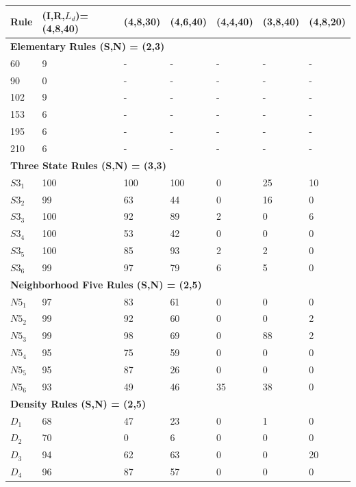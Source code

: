 \documentclass{elsarticle}
\begin{document}
\begin{multicols}{2}
\begin{table}[!htb] \centering
\small
\begin{tabular}{|l|l|l|l|l|l|l|}
\hline
\textbf{Rule} & \textbf{(I,R,$L_{d}$)=(4,8,40)} & \textbf{(4,8,30)} & 
\textbf{(4,6,40)} & \textbf{(4,4,40)} & \textbf{(3,8,40)} & \textbf{(4,8,20)} 
\\ \hline
\multicolumn{7}{|l|}{\textbf{Elementary Rules (S,N) = (2,3)}} \\ \hline
60 & 9 & - & - & - & - & - \\ \hline
90 & 0 & - & - & - & - & - \\ \hline
102 & 9 & - & - & - & - & - \\ \hline
153 & 6 & - & - & - & - & - \\ \hline
195 & 6 & - & - & - & - & - \\ \hline
210 & 6 & - & - & - & - & - \\ \hline
\multicolumn{7}{|l|}{\textbf{Three State Rules (S,N) = (3,3)}} \\ \hline
$S3_{1}$ & 100 & 100 & 100 & 0 & 25 & 10 \\ \hline
$S3_{2}$ & 99 & 63 & 44 & 0 & 16 & 0 \\ \hline
$S3_{3}$ & 100 & 92 & 89 & 2 & 0 & 6 \\ \hline
$S3_{4}$ & 100 & 53 & 42 & 0 & 0 & 0 \\ \hline
$S3_{5}$ & 100 & 85 & 93 & 2 & 2 & 0 \\ \hline
$S3_{6}$ & 99 & 97 & 79 & 6 & 5 & 0 \\ \hline
\multicolumn{7}{|l|}{\textbf{Neighborhood Five Rules (S,N) = (2,5)}} \\ \hline
$N5_{1}$ & 97 & 83 & 61 & 0 & 0 & 0 \\ \hline
$N5_{2}$ & 99 & 92 & 60 & 0 & 0 & 2 \\ \hline
$N5_{3}$ & 99 & 98 & 69 & 0 & 88 & 2  \\ \hline
$N5_{4}$ & 95 & 75 & 59 & 0 & 0 & 0 \\ \hline
$N5_{5}$ & 95 & 87 & 26 & 0 & 0 & 0 \\ \hline
$N5_{6}$ & 93 & 49 & 46 & 35 & 38 & 0  \\ \hline
\multicolumn{7}{|l|}{\textbf{Density Rules (S,N) = (2,5)}} \\ \hline
$D_{1}$ & 68 & 47 & 23 & 0 & 1 & 0  \\ \hline
$D_{2}$ & 70 & 0 & 6 & 0 & 0 & 0 \\ \hline
$D_{3}$ & 94 & 62 & 63 & 0 & 0 & 20 \\ \hline
$D_{4}$ & 96 & 87 & 57 & 0 & 0 & 0 \\ \hline

\end{tabular}
\end{table}
\end{multicols}
\end{document}
